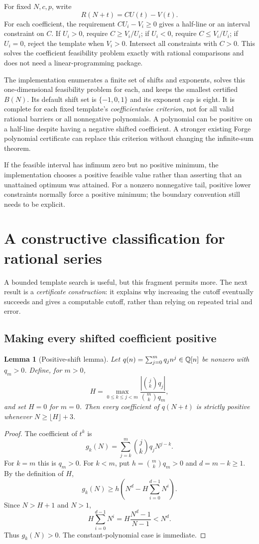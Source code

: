 \documentclass[11pt,a4paper]{article}
\newtheorem{lemma}[theorem]{Lemma}
\theoremstyle{definition}\newtheorem{definition}[theorem]{Definition}
\begin{document}
For fixed $N,c,p$, write
\[
 R(N+t)=C U(t)-V(t).
\]
For each coefficient, the requirement $C U_i-V_i\ge0$ gives a half-line or an
interval constraint on $C$. If $U_i>0$, require $C\ge V_i/U_i$; if $U_i<0$,
require $C\le V_i/U_i$; if $U_i=0$, reject the template when $V_i>0$.
Intersect all constraints with $C>0$. This solves the coefficient feasibility
problem exactly with rational comparisons and does not need a linear-programming
package.

The implementation enumerates a finite set of shifts and exponents, solves this
one-dimensional feasibility problem for each, and keeps the smallest certified
$B(N)$. Its default shift set is $\{-1,0,1\}$ and its exponent cap is eight.
It is complete for each fixed template's \emph{coefficientwise criterion}, not
for all valid rational barriers or all nonnegative polynomials. A polynomial
can be positive on a half-line despite having a negative shifted coefficient.
A stronger existing Forge polynomial certificate can replace this criterion
without changing the infinite-sum theorem.

If the feasible interval has infimum zero but no positive minimum, the
implementation chooses a positive feasible value rather than asserting that
an unattained optimum was attained. For a nonzero nonnegative tail, positive
lower constraints normally force a positive minimum; the boundary convention
still needs to be explicit.

\section{A constructive classification for rational series}
\label{sec:classification}

A bounded template search is useful, but this fragment permits more. The next
result is a \emph{certificate construction}: it explains why increasing the
cutoff eventually succeeds and gives a computable cutoff, rather than relying
on repeated trial and error.

\subsection{Making every shifted coefficient positive}

\begin{lemma}[Positive-shift lemma]\label{lem:shift}
Let $q(n)=\sum_{j=0}^{m}q_jn^j\in\mathbb Q[n]$ be nonzero with $q_m>0$.
Define, for $m>0$,
\[
 H=\max_{0\le k\le j<m}
 \frac{|\binom{j}{k}q_j|}{\binom{m}{k}q_m},
\]
and set $H=0$ for $m=0$. Then every coefficient of $q(N+t)$ is strictly
positive whenever $N\ge\lfloor H\rfloor+3$.
\end{lemma}
\begin{proof}
The coefficient of $t^k$ is
\[
 g_k(N)=\sum_{j=k}^{m}\binom{j}{k}q_jN^{j-k}.
\]
For $k=m$ this is $q_m>0$. For $k<m$, put
$h=\binom{m}{k}q_m>0$ and $d=m-k\ge1$. By the definition of $H$,
\[
 g_k(N)\ge h\left(N^d-H\sum_{i=0}^{d-1}N^i\right).
\]
Since $N>H+1$ and $N>1$,
\[
 H\sum_{i=0}^{d-1}N^i
 =H\frac{N^d-1}{N-1}<N^d.
\]
Thus $g_k(N)>0$. The constant-polynomial case is immediate.
\end{proof}
\end{document}

